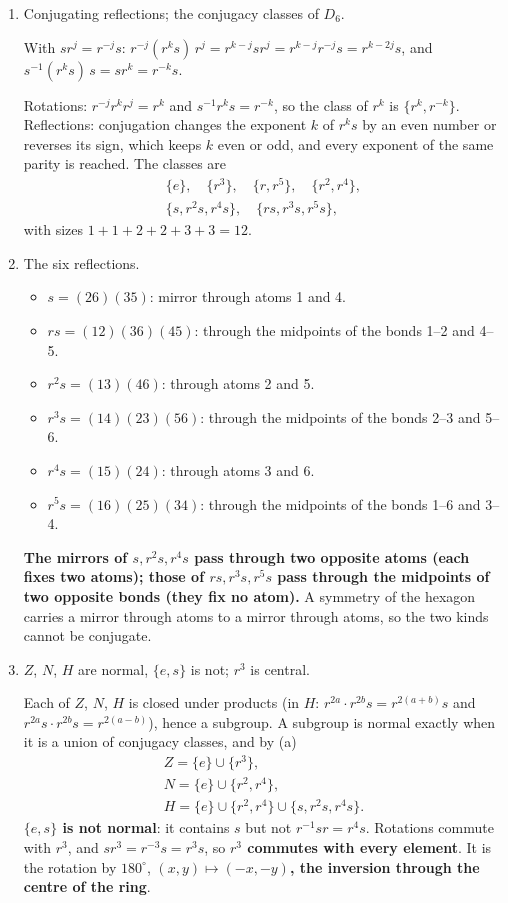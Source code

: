 \documentclass[11pt,a4paper]{article}
\newcommand{\prob}[1]{\par\vspace{1.1em}\noindent{\bfseries\large #1}\par\vspace{0.1em}}
\newenvironment{parts}{\begin{enumerate}[label=\textbf{(\alph*)},leftmargin=2.2em,itemsep=0.6em,topsep=0.2em]}{\end{enumerate}}
\newcommand{\pq}[1]{\item {\color{black!60}#1}\par}
\newcommand{\ans}[1]{{\boldmath\bfseries #1}}
\begin{document}
\prob{2. The symmetries of benzene}
\begin{parts}
\pq{Conjugating reflections; the conjugacy classes of $D_6$.}
With $s r^j = r^{-j} s$: $r^{-j}(r^k s)\, r^j = r^{k - j} s r^j = r^{k - j} r^{-j} s = r^{k - 2j} s$, and $s^{-1}(r^k s)\, s = s r^k = r^{-k} s$.

Rotations: $r^{-j} r^k r^j = r^k$ and $s^{-1} r^k s = r^{-k}$, so the class of $r^k$ is $\{r^k, r^{-k}\}$. Reflections: conjugation changes the exponent $k$ of $r^k s$ by an even number or reverses its sign, which keeps $k$ even or odd, and every exponent of the same parity is reached. The classes are
\[
  \begin{gathered}
  \{e\}, \quad \{r^3\}, \quad \{r, r^5\}, \quad \{r^2, r^4\}, \\
  \{s, r^2 s, r^4 s\}, \quad \{rs, r^3 s, r^5 s\},
  \end{gathered}
\]
with sizes \ans{$1 + 1 + 2 + 2 + 3 + 3 = 12$}.

\pq{The six reflections.}
\begin{itemize}
  \item $s = (26)(35)$: mirror through atoms 1 and 4.
  \item $rs = (12)(36)(45)$: through the midpoints of the bonds 1--2 and 4--5.
  \item $r^2 s = (13)(46)$: through atoms 2 and 5.
  \item $r^3 s = (14)(23)(56)$: through the midpoints of the bonds 2--3 and 5--6.
  \item $r^4 s = (15)(24)$: through atoms 3 and 6.
  \item $r^5 s = (16)(25)(34)$: through the midpoints of the bonds 1--6 and 3--4.
\end{itemize}
\ans{The mirrors of $s, r^2 s, r^4 s$ pass through two opposite atoms (each fixes two atoms); those of $rs, r^3 s, r^5 s$ pass through the midpoints of two opposite bonds (they fix no atom).} A symmetry of the hexagon carries a mirror through atoms to a mirror through atoms, so the two kinds cannot be conjugate.

\pq{$Z$, $N$, $H$ are normal, $\{e, s\}$ is not; $r^3$ is central.}
Each of $Z$, $N$, $H$ is closed under products (in $H$: $r^{2a} \cdot r^{2b} s = r^{2(a+b)} s$ and $r^{2a} s \cdot r^{2b} s = r^{2(a - b)}$), hence a subgroup. A subgroup is normal exactly when it is a union of conjugacy classes, and by (a)
\[
  \begin{gathered}
  Z = \{e\} \cup \{r^3\}, \\
  N = \{e\} \cup \{r^2, r^4\}, \\
  H = \{e\} \cup \{r^2, r^4\} \cup \{s, r^2 s, r^4 s\}.
  \end{gathered}
\]
\ans{$\{e, s\}$ is not normal}: it contains $s$ but not $r^{-1} s r = r^4 s$. Rotations commute with $r^3$, and $s r^3 = r^{-3} s = r^3 s$, so \ans{$r^3$ commutes with every element}. It is the rotation by $180^\circ$, \ans{$(x, y) \mapsto (-x, -y)$, the inversion through the centre of the ring}.


\end{parts}
\end{document}
